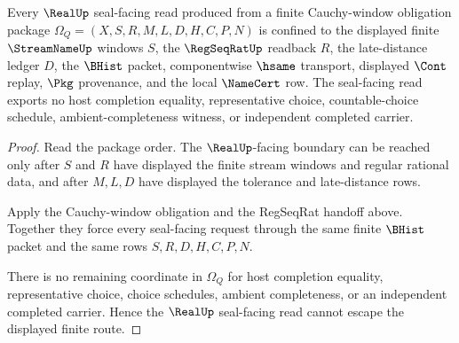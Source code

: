 \begin{theorem}
\label{thm:sequentially-complete-metric-real-seal-nonescape}
Every $\RealUp$ seal-facing read produced from a finite Cauchy-window obligation package $\Omega_Q=(X,S,R,M,L,D,H,C,P,N)$ is confined to the displayed finite $\StreamNameUp$ windows $S$, the $\RegSeqRatUp$ readback $R$, the late-distance ledger $D$, the $\BHist$ packet, componentwise $\hsame$ transport, displayed $\Cont$ replay, $\Pkg$ provenance, and the local $\NameCert$ row. The seal-facing read exports no host completion equality, representative choice, countable-choice schedule, ambient-completeness witness, or independent completed carrier.
\end{theorem}
\begin{proof}
Read the package order. The $\RealUp$-facing boundary can be reached only after $S$ and $R$ have displayed the finite stream windows and regular rational data, and after $M,L,D$ have displayed the tolerance and late-distance rows.

Apply the Cauchy-window obligation and the RegSeqRat handoff above. Together they force every seal-facing request through the same finite $\BHist$ packet and the same rows $S,R,D,H,C,P,N$.

There is no remaining coordinate in $\Omega_Q$ for host completion equality, representative choice, choice schedules, ambient completeness, or an independent completed carrier. Hence the $\RealUp$ seal-facing read cannot escape the displayed finite route.
\end{proof}

